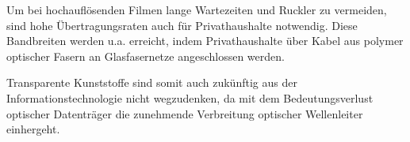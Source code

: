 Um bei hochauflösenden Filmen lange Wartezeiten und \glqq Ruckler\grqq{} zu
vermeiden, sind hohe Übertragungsraten auch für Privathaushalte notwendig. Diese
Bandbreiten werden u.a. erreicht, indem Privathaushalte über Kabel aus polymer
optischer Fasern an Glasfasernetze angeschlossen werden.

Transparente Kunststoffe sind somit auch zukünftig aus der
Informationstechnologie nicht wegzudenken, da mit dem Bedeutungsverlust
optischer Datenträger die zunehmende Verbreitung optischer Wellenleiter
einhergeht.
